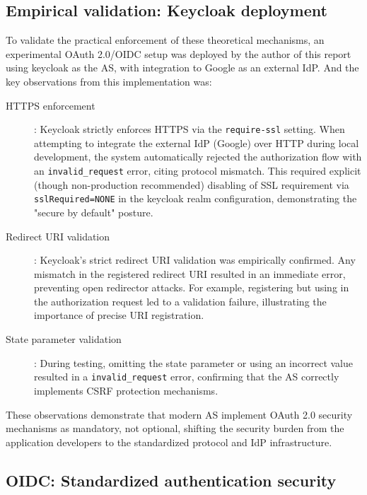 \documentclass[../memoire.tex]{subfiles}
\begin{document}
\subsection*{Empirical validation: Keycloak deployment}

To validate the practical enforcement of these theoretical mechanisms, an experimental OAuth 2.0/OIDC setup was deployed by the author of this report using keycloak as the AS, with integration to Google as an external IdP. And the key observations from this implementation was:

\begin{description}
  \item[HTTPS enforcement]: Keycloak strictly enforces HTTPS via the \texttt{require-ssl} setting. When attempting to integrate the external IdP (Google) over HTTP during local development, the system automatically rejected the authorization flow with an \texttt{invalid\_request} error, citing protocol mismatch. This required explicit (though non-production recommended) disabling of SSL requirement via \texttt{sslRequired=NONE} in the keycloak realm configuration, demonstrating the "secure by default" posture.
  \item[Redirect URI validation]: Keycloak's strict redirect URI validation was empirically confirmed. Any mismatch in the registered redirect URI resulted in an immediate \texttt{} error, preventing open redirector attacks. For example, registering \texttt{} but using \texttt{} in the authorization request led to a validation failure, illustrating the importance of precise URI registration.
  \item[State parameter validation]: During testing, omitting the state parameter or using an incorrect value resulted in a \texttt{invalid\_request} error, confirming that the AS correctly implements CSRF protection mechanisms.
\end{description}

These observations demonstrate that modern AS implement OAuth 2.0 security mechanisms as mandatory, not optional, shifting the security burden from the application developers to the standardized protocol and IdP infrastructure.

\subsection{OIDC: Standardized authentication security}
\end{document}
